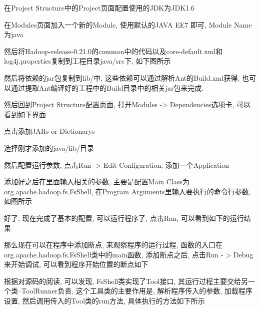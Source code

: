 

在Project Structure中的Project页面配置使用的JDK为JDK1.6


在Modules页面加入一个新的Module, 使用默认的JAVA EE7 即可, Module Name为java



然后将Hadoop-release-0.21.0的common中的代码以及core-default.xml和log4j.properties复制到工程目录java/src下, 如下图所示


然后将{\Hadoop}依赖的jar包复制到lib/中, 这些依赖可以通过解析Ant的Build.xml获得,
也可以通过提取Ant编译好的工程中的Build目录中的相关jar包来完成.

然后回到Project Structure配置页面, 打开Modules -> Dependencies选项卡, 可以看到如下界面


点击添加JARs or Dictionarys


选择刚才添加的java/lib/目录


然后配置运行参数, 点击Run -> Edit Configuration, 添加一个Application


添加好之后在里面输入相关的参数, 主要是配置Main Class为org.apache.hadoop.fs.FsShell,
在Program Arguments里输入要执行的命令行参数, 如图所示


好了, 现在完成了基本的配置, 可以运行程序了, 点击Run, 可以看到如下的运行结果


那么现在可以在程序中添加断点, 来观察程序的运行过程,
函数的入口在org.apache.hadoop.fs.FsShell类中的main函数, 添加断点之后,
点击Run - > Debug来开始调试, 可以看到程序开始位置的断点如下


根据对源码的阅读, 可以发现, FsShell类实现了Tool接口,
其运行过程主要交给另一个类--ToolRunner负责, 这个工具类的主要作用是,
解析程序传入的参数, 加载程序设置, 然后调用传入的Tool类的run方法, 具体执行的方法如下所示


